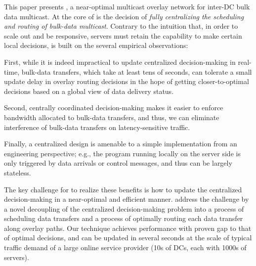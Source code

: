 This paper presents {\em \name}, a near-optimal multicast 
overlay network for inter-DC bulk data multicast.
At the core of \name is the decision of {\em fully centralizing 
the scheduling and routing of bulk-data multicast}.
Contrary to the intuition that, in order to scale out
and be responsive, servers must retain the capability to make
certain local decisions, \name is built on the several
empirical observations:
\begin{packeditemize}
\item First, while it is indeed impractical to update centralized 
decision-making in real-time, bulk-data transfers, which take
at least tens of seconds, can tolerate a small update delay in 
overlay routing decisions
in the hope of getting closer-to-optimal decisions based on
a global view of data delivery status.
\item Second, centrally coordinated decision-making makes it easier
to enforce bandwidth allocated to bulk-data transfers,
and thus, we can eliminate interference of bulk-data
transfers on latency-sensitive traffic.
\item Finally, a centralized design is amenable to a simple
implementation from an engineering perspective;
e.g., the program running locally on the server side is 
only triggered by data arrivals or control messages, and 
thus can be largely stateless.
\end{packeditemize}

The key challenge for \name to realize these benefits is how to
update the centralized decision-making in a near-optimal and 
efficient manner.
\name address the challenge by a novel decoupling of the 
centralized decision-making problem into a process of scheduling 
data transfers and a process of optimally routing each data 
transfer along overlay paths.
Our technique achieves performance with proven gap to that of 
optimal decisions, and can be updated in several seconds at the 
scale of typical traffic demand of a large online service 
provider (10s of DCs, each with 1000s of servers).

